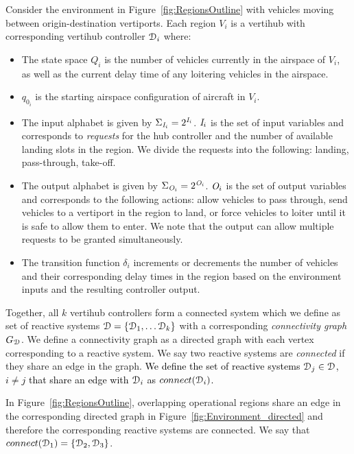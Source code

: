 \begin{eg}
Consider the environment in Figure~\ref{fig:RegionsOutline} with vehicles moving between origin-destination vertiports. Each region $V_i$ is a vertihub with corresponding vertihub controller $\mathcal{D}_i$ where: 
\begin{itemize}
    \item The state space $Q_i$ is the number of vehicles currently in the airspace of $V_i$, as well as the current delay time of any loitering vehicles in the airspace.
    \item $q_{0_i}$ is the starting airspace configuration of aircraft in $V_i$.
    \item The input alphabet is given by $\Sigma_{\textit{I}_{i}} = 2^{\textit{I}_i}$. $\textit{I}_i$ is the set of input variables and corresponds to \emph{requests} for the hub controller and the number of available landing slots in the region. We divide the requests into the following: landing, pass-through, take-off. 
    \item The output alphabet is given by $\Sigma_{\textit{O}_{i}} = 2^{\textit{O}_i}$. $\textit{O}_i$ is the set of output variables and corresponds to the following actions: allow vehicles to pass through, send vehicles to a vertiport in the region to land, or force vehicles to loiter until it is safe to allow them to enter. We note that the output can allow multiple requests to be granted simultaneously. 
    \item The transition function $\delta_i$ increments or decrements the number of vehicles and their corresponding delay times in the region based on the environment inputs and the resulting controller output. 
\end{itemize}
\end{eg}




Together, all $k$ vertihub controllers form a connected system which we define as set of reactive systems $\mathcal{D} = \{\mathcal{D}_1, \dots \mathcal{D}_k\}$ with a corresponding \emph{connectivity graph} $G_{\mathcal{D}}$.
We define a connectivity graph as a directed graph with each vertex corresponding to a reactive system.
We say two reactive systems are \emph{connected} if they share an edge in the graph. \textcolor{black}{ We define the set of reactive systems $\mathcal{D}_j \in \mathcal{D}$, $i \neq j$ that share an edge with $\mathcal{D}_i$ as $connect(\mathcal{D}_i)$.}
\begin{eg}
In Figure~\ref{fig:RegionsOutline}, overlapping operational regions share an edge in the corresponding directed graph in Figure~\ref{fig:Environment_directed} and therefore the corresponding reactive systems are connected. We say that $connect(\mathcal{D}_1) = \{\mathcal{D}_2,\mathcal{D}_3 \}$.
\end{eg}


